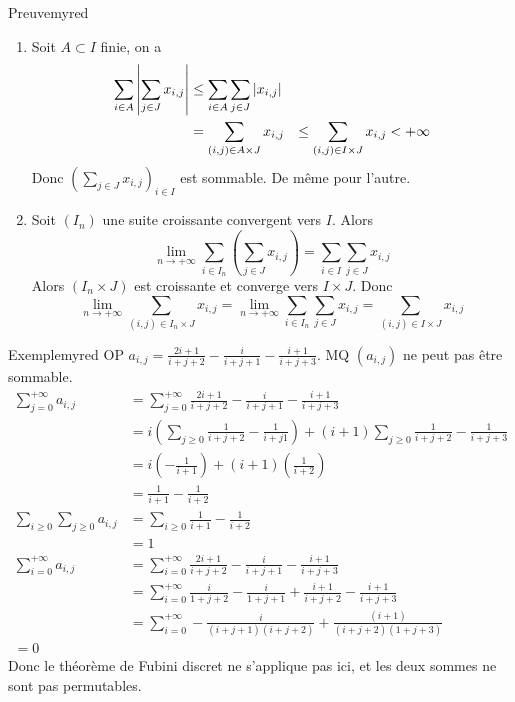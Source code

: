     \begin{demo}{Preuve}{myred}
        \begin{enumerate}
            \item Soit $A \subset I$ finie, on a 
            \begin{align*}
                \sum_{i \in A} \left\lvert \sum_{j \in J} x_{i,j}\right\rvert 
                &\leq \sum_{i \in A} \sum_{j \in J} \left\lvert x_{i,j}\right\rvert \\
                &= \sum_{(i,j) \in A \times J} x_{i,j}
                &\leq \sum_{(i,j) \in I \times J} x_{i,j} < +\infty
            \end{align*}
            Donc $\left(\sum_{j \in J} x_{i,j}\right)_{i \in I}$ est sommable. De même pour l’autre.
            \item Soit $(I_n)$ une suite croissante convergent vers $I$. Alors 
            \[ \lim_{n \to +\infty} \sum_{i \in I_n} \left(\sum_{j \in J} x_{i,j}\right) = \sum_{i \in I} \sum_{j \in J} x_{i,j} \]   
            Alors $(I_n \times J)$ est croissante et converge vers $I \times J$. Donc \[ \lim_{n \to +\infty} \sum_{(i,j) \in I_n \times J} x_{i,j} = \lim_{n \to +\infty} \sum_{i \in I_n} \sum_{j \in J} x_{i,j} = \sum_{(i,j) \in I \times J} x_{i,j} \]   
        \end{enumerate}
    \end{demo}

    \begin{omed}{Exemple}{myred}
        OP $a_{i,j} = \frac{2i+1}{i+j+2} - \frac{i}{i + j + 1} - \frac{i + 1}{i + j + 3}$. MQ $(a_{i,j})$ ne peut pas être sommable.
        \begin{align*}
            \sum_{j = 0}^{+\infty} a_{i,j} 
            &= \sum_{j = 0}^{+\infty} \frac{2i+1}{i+j+2} - \frac{i}{i + j + 1} - \frac{i + 1}{i + j + 3} \\
            &= i\left(\sum_{j \geq 0} \frac{1}{i + j + 2} - \frac{1}{i + j 1}\right) + (i+1) \sum_{j \geq 0} \frac{1}{i + j + 2} - \frac{1}{i + j + 3} \\
            &= i\left(-\frac{1}{i + 1}\right) + (i+1) \left(\frac{1}{i + 2}\right) \\
            &= \frac{1}{i + 1} - \frac{1}{i + 2} \\
            \sum_{i \geq 0} \sum_{j \geq 0} a_{i,j} &= \sum_{i \geq 0} \frac{1}{i + 1} - \frac{1}{i + 2} \\
            &= 1 \\
            \sum_{i = 0}^{+\infty} a_{i,j} &= \sum_{i = 0}^{+\infty} \frac{2i + 1}{i + j + 2} - \frac{i}{i + j + 1} - \frac{i + 1}{i + j + 3} \\
            &= \sum_{i = 0}^{+\infty} \frac{i}{1 + j + 2} - \frac{i}{1 + j + 1} + \frac{i+ 1}{i + j + 2} - \frac{i + 1}{i + j + 3} \\
            &= \sum_{i = 0}^{+\infty} -\frac{i}{(i + j + 1)(i + j + 2)} + \frac{(i+ 1)}{(i + j + 2)(1 + j + 3)} \\
            = 0 
        \end{align*}
        Donc le théorème de Fubini discret ne s’applique pas ici, et les deux sommes ne sont pas permutables.
    \end{omed}

